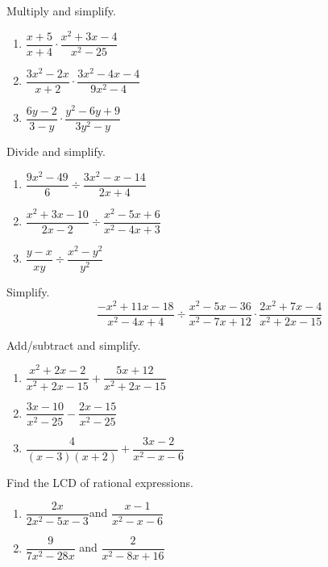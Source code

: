 \begin{exercise}
  Multiply and simplify.
  
  \begin{enumerate}
  \item
    \(\dfrac{x+5}{x+4}\cdot\dfrac{x^2+3x-4}{x^2-25}\)
  \item
    \(\dfrac{3x^2-2x}{x+2}\cdot\dfrac{3x^2-4x-4}{9x^2-4}\)
  \item
    \(\dfrac{6y-2}{3-y}\cdot\dfrac{y^2-6y+9}{3y^2-y}\)
  \end{enumerate}
\end{exercise}

\begin{exercise}
  Divide and simplify.
  
  \begin{enumerate}
  \item
    \(\dfrac{9x^2-49}{6}\div\dfrac{3x^2-x-14}{2x+4}\)
  \item
    \(\dfrac{x^2+3x-10}{2x-2}\div\dfrac{x^2-5x+6}{x^2-4x+3}\)
  \item
    \(\dfrac{y-x}{xy}\div\dfrac{x^2-y^2}{y^2}\)
  \end{enumerate}
\end{exercise}

\begin{exercise}
  Simplify. \[
  \frac{-x^2+11x-18}{x^2-4x+4}\div \frac{x^2-5x-36}{x^2-7x+12}\cdot \frac{2x^2+7x-4}{x^2+2x-15}
  \]
\end{exercise}
\vspace*{4\baselineskip}

\begin{exercise}
  Add/subtract and simplify.
  
  \begin{enumerate}
  \item
    \(\dfrac{x^2+2x-2}{x^2+2x-15}+\dfrac{5x+12}{x^2+2x-15}\)
  \item
    \(\dfrac{3x-10}{x^2-25}-\dfrac{2x-15}{x^2-25}\)
  \item
    \(\dfrac{4}{(x-3)(x+2)}+\dfrac{3x-2}{x^2-x-6}\)
  \end{enumerate}
\end{exercise}

\begin{exercise}
  Find the LCD of rational expressions.
  
  \begin{enumerate}
  \item
    \(\dfrac{2x}{2x^2-5x-3}\)\quad and \quad \(\dfrac{x-1}{x^2-x-6}\)
  \item
    \(\dfrac{9}{7x^2-28x}\) \quad and \quad \(\dfrac{2}{x^2-8x+16}\)
  \end{enumerate}
\end{exercise}

